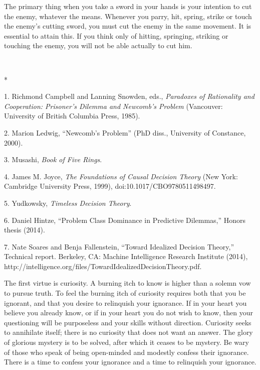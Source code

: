 {
 The primary thing when you take a sword in your hands is your
intention to cut the enemy, whatever the means. Whenever you parry,
hit, spring, strike or touch the enemy's cutting sword,
you must cut the enemy in the same movement. It is essential to attain
this. If you think only of hitting, springing, striking or touching the
enemy, you will not be able actually to cut him.}

{\centering
 \ ~
\par}

{\centering
 *
\par}


\bigskip

{
 1. Richmond Campbell and Lanning Snowden, eds., \textit{Paradoxes
of Rationality and Cooperation: Prisoner's Dilemma and
Newcomb's Problem} (Vancouver: University of British
Columbia Press, 1985).}

{
 2. Marion Ledwig, ``Newcomb's
Problem'' (PhD diss., University of Constance,
2000).}

{
 3. Musashi, \textit{Book of Five Rings}.}

{
 4. James M. Joyce, \textit{The Foundations of Causal Decision
Theory} (New York: Cambridge University Press, 1999),
doi:10.1017/CBO9780511498497.}

{
 5. Yudkowsky, \textit{Timeless Decision Theory}.}

{
 6. Daniel Hintze, ``Problem Class Dominance in
Predictive Dilemmas,'' Honors thesis (2014).}

{
 7. Nate Soares and Benja Fallenstein, ``Toward
Idealized Decision Theory,'' Technical report.
Berkeley, CA: Machine Intelligence Research Institute (2014),
http://intelligence.org/files/TowardIdealizedDecisionTheory.pdf.}


{
 The first virtue is curiosity. A burning itch to know is higher
than a solemn vow to pursue truth. To feel the burning itch of
curiosity requires both that you be ignorant, and that you desire to
relinquish your ignorance. If in your heart you believe you already
know, or if in your heart you do not wish to know, then your
questioning will be purposeless and your skills without direction.
Curiosity seeks to annihilate itself; there is no curiosity that does
not want an answer. The glory of glorious mystery is to be solved,
after which it ceases to be mystery. Be wary of those who speak of
being open-minded and modestly confess their ignorance. There is a time
to confess your ignorance and a time to relinquish your ignorance.}

